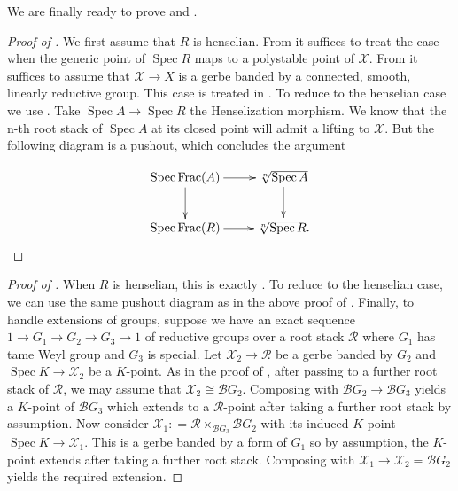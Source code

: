 \documentclass{amsart}
\theoremstyle{definition}
\newcommand{\cX}{\mathcal{X}}
\newcommand{\cB}{\mathcal{B}}
\newcommand{\cR}{\mathcal{R}}
\DeclareMathOperator{\Frac}{Frac}
\newcommand{\spec}{\operatorname{Spec}}
\begin{document}
We are finally ready to prove  and .
\begin{proof}[Proof of ]
We first assume that $R$ is henselian. From
 it suffices to treat the case when the generic point of $\spec R$ maps to a polystable point of $\cX$. From  it suffices to assume that $\cX\to X$ is a gerbe banded by a connected, smooth, linearly reductive group. This case is treated in .
To reduce to the henselian case we use \cite[Theorem B]{rydh2011etale}. Take $\spec A\to \spec R$ the Henselization morphism. We know that the n-th root stack of $\spec A$ at its closed point will admit a lifting to $\cX$. But the following diagram is a pushout, which concludes the argument

\[
\xymatrix{\spec \Frac(A)\ar[r] \ar[d] & \sqrt[n]{\spec A}\ar[d] \\ \spec \Frac(R) \ar[r] &\sqrt[n]{\spec R}.}
\]
\end{proof}

\begin{proof}[Proof of ]

When $R$ is henselian, this is exactly . To reduce to the henselian case, we can use the same pushout diagram as in the above proof of . Finally, to handle extensions of groups, suppose we have an exact sequence $1 \to G_1 \to G_2 \to G_3 \to 1$ of reductive groups over a root stack $\cR$ where $G_1$ has tame Weyl group and $G_3$ is special. Let $\cX_2 \to \cR$ be a gerbe banded by $G_2$ and $\spec K \to \cX_2$ be a $K$-point. As in the proof of , after passing to a further root stack of $\cR$, we may assume that $\cX_2 \cong \cB G_2$. Composing with $\cB G_2 \to \cB G_3$ yields a $K$-point of $\cB G_3$ which extends to a $\cR$-point after taking a further root stack by assumption. Now consider $\cX_1 \colon  = \cR \times_{\cB G_3} \cB G_2$ with its induced $K$-point $\spec K \to \cX_1$. This is a gerbe banded by a form of $G_1$ so by assumption, the $K$-point extends after taking a further root stack. Composing with $\cX_1 \to \cX_2 = \cB G_2$ yields the required extension. 
\end{proof}
\end{document}
